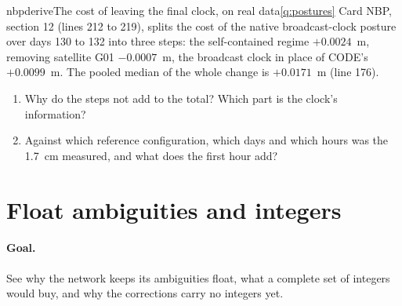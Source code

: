 \begin{question}{nbp}{derive}{The cost of leaving the final clock, on real data}{\ref{q:postures}}
Card NBP, section 12 (lines 212 to 219), splits the cost of the native
broadcast-clock posture over days 130 to 132 into three steps: the self-contained
regime $+0.0024$~m, removing satellite G01 $-0.0007$~m, the broadcast clock in place
of CODE's $+0.0099$~m. The pooled median of the whole change is $+0.0171$~m (line
176).
\begin{enumerate}[leftmargin=*, itemsep=1pt]
\item Why do the steps not add to the total? Which part is the clock's
      information?
\item Against which reference configuration, which days and which hours was the
      1.7~cm measured, and what does the first hour add?
\end{enumerate}
\end{question}


\section{Float ambiguities and integers}\label{sec:l7}

\paragraph{Goal.} See why the network keeps its ambiguities float, what a complete
set of integers would buy, and why the corrections carry no integers yet.

